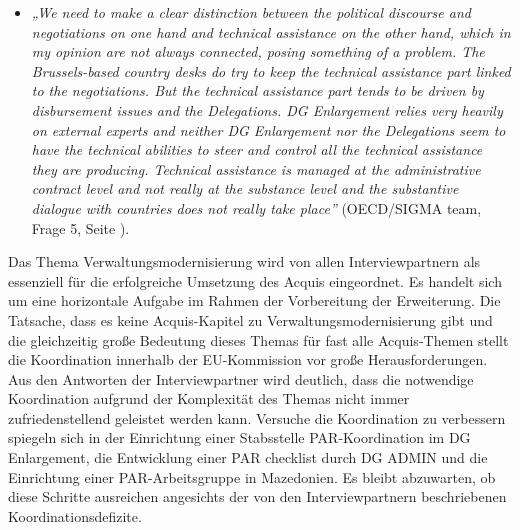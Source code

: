 \begin{itemize}[label={}]
\item \textit{„We need to make a clear distinction between the political discourse and negotiations on one hand and technical assistance on the other hand, which in my opinion are not always connected, posing something of a problem. The Brussels-based country desks do try to keep the technical assistance part linked to the negotiations. But the technical assistance part tends to be driven by disbursement issues and the Delegations. DG Enlargement relies very heavily on external experts and neither DG Enlargement nor the Delegations seem to have the technical abilities to steer and control all the technical assistance they are producing. Technical assistance is managed at the administrative contract level and not really at the substance level and the substantive dialogue with countries does not really take place”} (OECD/SIGMA team, Frage 5, Seite \pageref{sec:admin}).
\end{itemize}
Das Thema Verwaltungsmodernisierung wird von allen Interviewpartnern als essenziell für die erfolgreiche Umsetzung des Acquis eingeordnet. Es handelt sich um eine horizontale Aufgabe im Rahmen der Vorbereitung der Erweiterung. Die Tatsache, dass es keine Acquis-Kapitel zu Verwaltungsmodernisierung gibt und die gleichzeitig große Bedeutung dieses Themas für fast alle Acquis-Themen stellt die Koordination innerhalb der EU-Kommission vor große Herausforderungen. Aus den Antworten der Interviewpartner wird deutlich, dass die notwendige Koordination aufgrund der Komplexität des Themas nicht immer zufriedenstellend geleistet werden kann. Versuche die Koordination zu verbessern spiegeln sich in der Einrichtung einer Stabsstelle PAR-Koordination im DG Enlargement, die Entwicklung einer PAR checklist durch DG ADMIN und die Einrichtung einer PAR-Arbeitsgruppe in Mazedonien. Es bleibt abzuwarten, ob diese Schritte ausreichen angesichts der von den Interviewpartnern beschriebenen Koordinationsdefizite.
